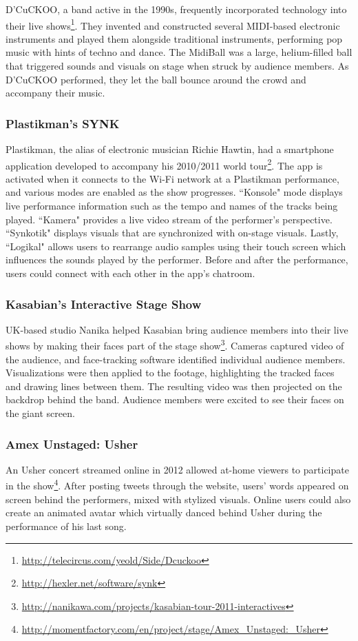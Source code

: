 D'CuCKOO, a band active in the 1990s, frequently incorporated technology into their live shows\footnote{\url{http://telecircus.com/yeold/Side/Dcuckoo}}. They invented and constructed several MIDI-based electronic instruments and played them alongside traditional instruments, performing pop music with hints of techno and dance. The MidiBall was a large, helium-filled ball that triggered sounds and visuals on stage when struck by audience members. As D'CuCKOO performed, they let the ball bounce around the crowd and accompany their music.

\subsubsection{Plastikman's SYNK}

Plastikman, the alias of electronic musician Richie Hawtin, had a smartphone application developed to accompany his 2010/2011 world tour\footnote{\url{http://hexler.net/software/synk}}. The app is activated when it connects to the Wi-Fi network at a Plastikman performance, and various modes are enabled as the show progresses. ``Konsole" mode displays live performance information such as the tempo and names of the tracks being played. ``Kamera" provides a live video stream of the performer's perspective. ``Synkotik" displays visuals that are synchronized with on-stage visuals. Lastly, ``Logikal" allows users to rearrange audio samples using their touch screen which influences the sounds played by the performer. Before and after the performance, users could connect with each other in the app's chatroom.

\subsubsection{Kasabian's Interactive Stage Show}

UK-based studio Nanika helped Kasabian bring audience members into their live shows by making their faces part of the stage show\footnote{\url{http://nanikawa.com/projects/kasabian-tour-2011-interactives}}. Cameras captured video of the audience, and face-tracking software identified individual audience members. Visualizations were then applied to the footage, highlighting the tracked faces and drawing lines between them. The resulting video was then projected on the backdrop behind the band. Audience members were excited to see their faces on the giant screen.

\subsubsection{Amex Unstaged: Usher}
An Usher concert streamed online in 2012 allowed at-home viewers to participate in the show\footnote{\url{http://momentfactory.com/en/project/stage/Amex_Unstaged:_Usher}}. After posting tweets through the website, users' words appeared on screen behind the performers, mixed with stylized visuals. Online users could also create an animated avatar which virtually danced behind Usher during the performance of his last song.


